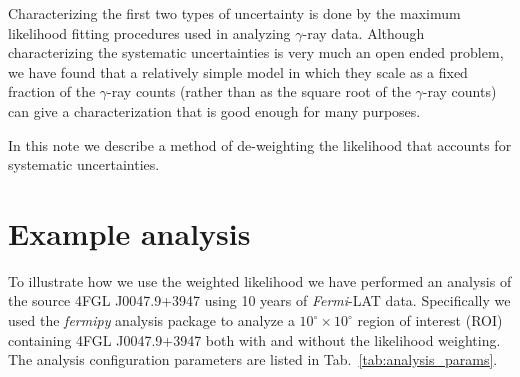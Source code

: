 \documentclass[preprint]{aastex}
\begin{document}
Characterizing the first two types of uncertainty is done by the maximum likelihood fitting 
procedures used in analyzing $\gamma$-ray data.  Although characterizing the systematic 
uncertainties is very much an open ended problem,  we have found that a relatively simple 
model in which they scale as a fixed fraction of the
$\gamma$-ray counts (rather than as the square root of the $\gamma$-ray counts) can give
a characterization that is good enough for many purposes.  

In this note we describe a method of de-weighting the likelihood that accounts for
systematic uncertainties.


\section{Example analysis}

To illustrate how we use the weighted likelihood we have performed 
an analysis of the source 4FGL J0047.9+3947 using 10 years of {\it Fermi}-LAT 
data.  Specifically we used the {\it fermipy} analysis package
to analyze a $10^\circ \times 10^\circ$ region of interest (ROI)
containing 4FGL J0047.9+3947 both with and without the likelihood weighting.
The analysis configuration parameters are listed in Tab.~\ref{tab:analysis_params}.
\end{document}
